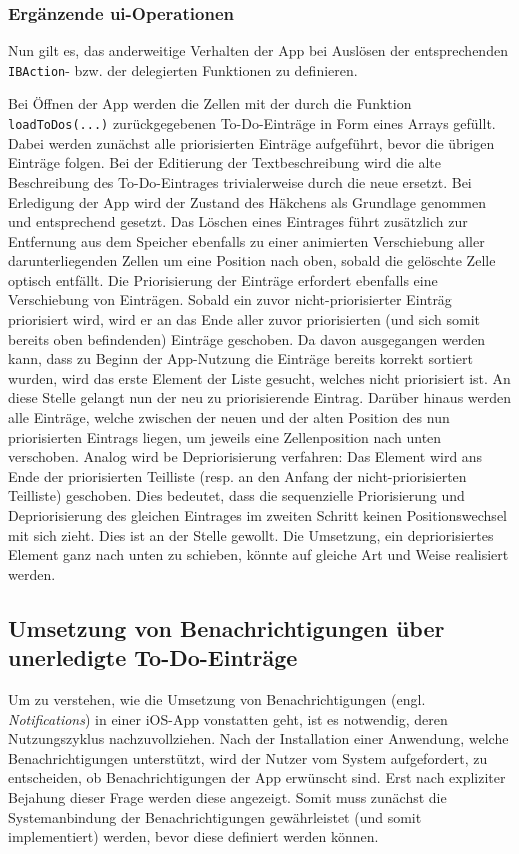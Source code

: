 \subsubsection{Ergänzende \ac{ui}-Operationen}
Nun gilt es, das anderweitige Verhalten der App bei Auslösen der entsprechenden \texttt{IBAction}- bzw. der delegierten  Funktionen zu definieren.

Bei Öffnen der App werden die Zellen mit der durch die Funktion \texttt{loadToDos(...)} zurückgegebenen To-Do-Einträge in Form eines Arrays gefüllt. Dabei werden zunächst alle priorisierten Einträge aufgeführt, bevor die übrigen Einträge folgen. Bei der Editierung der Textbeschreibung wird die alte Beschreibung des To-Do-Eintrages trivialerweise durch die neue ersetzt. Bei Erledigung der App wird der Zustand des Häkchens als Grundlage genommen und entsprechend gesetzt. Das Löschen eines Eintrages führt zusätzlich zur Entfernung aus dem Speicher ebenfalls zu einer animierten Verschiebung aller darunterliegenden Zellen um eine Position nach oben, sobald die gelöschte Zelle optisch entfällt. Die Priorisierung der Einträge erfordert ebenfalls eine Verschiebung von Einträgen. Sobald ein zuvor nicht-priorisierter Einträg priorisiert wird, wird er an das Ende aller zuvor priorisierten (und sich somit bereits oben befindenden) Einträge geschoben. Da davon ausgegangen werden kann, dass zu Beginn der App-Nutzung die Einträge bereits korrekt sortiert wurden, wird das erste Element der Liste gesucht, welches nicht priorisiert ist. An diese Stelle gelangt nun der neu zu priorisierende Eintrag. Darüber hinaus werden alle Einträge, welche zwischen der neuen und der alten Position des nun priorisierten Eintrags liegen, um jeweils eine Zellenposition nach unten verschoben. Analog wird be Depriorisierung verfahren: Das Element wird ans Ende der priorisierten Teilliste (resp. an den Anfang der nicht-priorisierten Teilliste) geschoben. Dies bedeutet, dass die sequenzielle Priorisierung und Depriorisierung des gleichen Eintrages im zweiten Schritt keinen Positionswechsel mit sich zieht. Dies ist an der Stelle gewollt. Die Umsetzung, ein depriorisiertes Element ganz nach unten zu schieben, könnte auf gleiche Art und Weise realisiert werden.



\subsection{Umsetzung von Benachrichtigungen über unerledigte To-Do-Einträge}
Um zu verstehen, wie die Umsetzung von Benachrichtigungen (engl. \textit{Notifications}) in einer iOS-App vonstatten geht, ist es notwendig, deren Nutzungszyklus nachzuvollziehen. Nach der Installation einer Anwendung, welche Benachrichtigungen unterstützt, wird der Nutzer vom System aufgefordert, zu entscheiden, ob Benachrichtigungen der App erwünscht sind. Erst nach expliziter Bejahung dieser Frage werden diese angezeigt. Somit muss zunächst die Systemanbindung der Benachrichtigungen gewährleistet (und somit implementiert) werden, bevor diese definiert werden können.

